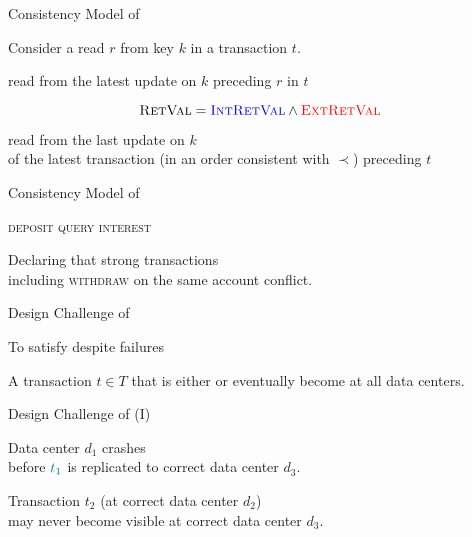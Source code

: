 \begin{frame}{Consistency Model of \unistore}
  \begin{center}
    Consider a read $r$ from key $k$ in a transaction $t$.

    \vspace{0.80cm}
    \blue{$\intretval:$} read from the latest update on $k$ preceding $r$ in $t$

    \[
      \textsc{RetVal} = \textcolor{blue}{\textsc{IntRetVal}} \land \textcolor{red}{\textsc{ExtRetVal}}
    \]

    \vspace{0.50cm}
    \red{$\extretval:$} read from the last update on $k$ \\[3pt]
    of the latest transaction (in an order consistent with $\prec$) preceding $t$
  \end{center}
\end{frame}

\begin{frame}{Consistency Model of \unistore}
  \begin{center}
    \textsc{deposit \quad {} \quad query \quad interest}

    \vspace{0.50cm}
    Declaring that strong transactions \\[3pt]
    including \textsc{withdraw} on the same account conflict.
  \end{center}
\end{frame}

\begin{frame}{Design Challenge of \unistore}
  \begin{center}
    {To satisfy  despite failures}

    \vspace{0.50cm}
    A transaction $t \in T$ that is either 
    or 
    eventually become  at all  data centers.
  \end{center}
\end{frame}

\begin{frame}{Design Challenge of \unistore{} (I)}
  \begin{center}
    {Data center $d_{1}$ crashes \\[3pt]
      before $\textcolor{teal}{t_{1}}$ is replicated to correct data center $d_{3}$.}

    \vspace{0.20cm}

    \pause
    Transaction $t_{2}$ (at correct data center $d_{2}$) \\[3pt]
    may never become visible at correct data center $d_{3}$.
  \end{center}
\end{frame}

